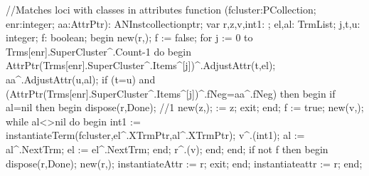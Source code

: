 //Matches loci with classes in attributes
function (fcluster:PCollection;
                         enr:integer;
                         aa:AttrPtr): ANInstcollectionptr;
var
   r,z,v,int1: ;
   el,al: TrmList;
   j,t,u: integer;
   f: boolean;
begin
   new(r,);
   f := false;
   for j := 0 to Trms[enr].SuperCluster^.Count-1 do
   begin
      AttrPtr(Trms[enr].SuperCluster^.Items^[j])^.AdjustAttr(t,el);
      aa^.AdjustAttr(u,al);
      if (t=u) and (AttrPtr(Trms[enr].SuperCluster^.Items^[j])^.fNeg=aa^.fNeg)
      then
      begin
         if al=nil then
         begin
            dispose(r,Done); //1
            new(z,);
             := z;
            exit;
         end;
         f := true;
         new(v,);
         while al<>nil do
         begin
            int1 := instantiateTerm(fcluster,el^.XTrmPtr,al^.XTrmPtr);
            v^.(int1);
            al := al^.NextTrm;
            el := el^.NextTrm;
         end;
         r^.(v);
      end;
   end;
   if not f then
   begin
      dispose(r,Done);
      new(r,);
      instantiateAttr := r;
      exit;
   end;
   instantiateattr := r;
end;
\eatline
